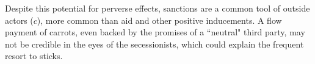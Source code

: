 \documentclass[11pt,letterpaper, notitlepage]{article}
\begin{document}





Despite this potential for perverse effects, sanctions are a common tool of outside actors ($c$), more common than aid and other positive inducements. A flow payment of carrots, even backed by the promises of a ``neutral" third party, may not be credible in the eyes of the secessionists, which could explain the frequent resort to sticks.
\end{document}
